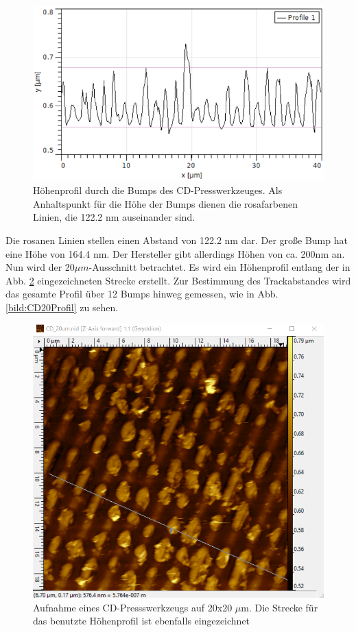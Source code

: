 \begin{figure}[h]
    \centering
    \includegraphics[scale = 0.65]{Bilder/CD50Profil.png}
    \caption{Höhenprofil durch die Bumps des CD-Presswerkzeuges. Als Anhaltspunkt für die Höhe der Bumps dienen die rosafarbenen Linien, die 
    122.2 nm auseinander sind.}
    \label{bild:CD50Profil}
\end{figure}


Die rosanen Linien stellen einen Abstand von 122.2 nm dar. Der große Bump hat eine Höhe von 164.4 nm. Der Hersteller 
gibt allerdings Höhen von ca. 200nm an. %
\\
Nun wird der 20$\mu m$-Ausschnitt betrachtet. Es wird ein Höhenprofil entlang der in Abb. \ref{bild:CD20Linie} eingezeichneten Strecke 
erstellt. Zur Bestimmung des Trackabstandes wird das gesamte Profil über 12 Bumps hinweg gemessen, wie in Abb. \ref{bild:CD20Profil} zu 
sehen. 

\begin{figure}[h]
    \centering
    \includegraphics[scale = 0.5]{Bilder/CD20Linie.png}
    \caption{Aufnahme eines CD-Pressswerkzeugs auf 20x20 $\mu$m. Die Strecke 
    für das benutzte Höhenprofil ist ebenfalls eingezeichnet}
    \label{bild:CD20Linie}
\end{figure}

